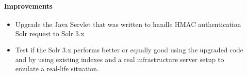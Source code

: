 \paragraph{Improvements}
\begin{itemize}
\item Upgrade the Java Servlet that was written to handle HMAC authentication Solr request to Solr 3.x
\item Test if the Solr 3.x performs better or equally good using the upgraded code and by using existing indexes and a real infrastructure server setup to emulate a real-life situation.
\end{itemize}